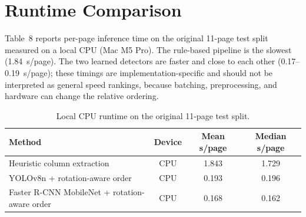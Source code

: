 \documentclass[pdflatex,sn-mathphys-num]{sn-jnl}
\begin{document}
\section{Runtime Comparison}

Table~8 reports per-page inference time on the original 11-page test split measured on a local CPU (Mac M5 Pro). The rule-based pipeline is the slowest (1.84~s/page). The two learned detectors are faster and close to each other (0.17--0.19~s/page); these timings are implementation-specific and should not be interpreted as general speed rankings, because batching, preprocessing, and hardware can change the relative ordering.

\begin{table}[t]
\centering
\scriptsize\setlength{\tabcolsep}{3pt}
\caption{Local CPU runtime on the original 11-page test split.}
\begin{tabular}{lccc}
\toprule
Method & Device & Mean s/page & Median s/page \\
\midrule
Heuristic column extraction & CPU & 1.843 & 1.729 \\
YOLOv8n + rotation-aware order & CPU & 0.193 & 0.196 \\
Faster R-CNN MobileNet + rotation-aware order & CPU & 0.168 & 0.162 \\
\bottomrule
\end{tabular}
\end{table}
\end{document}
